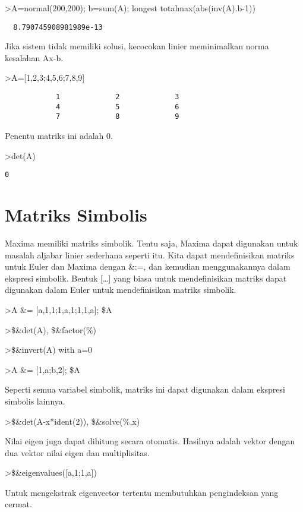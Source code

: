 \documentclass[
]{book}
\begin{document}
\textgreater A=normal(200,200); b=sum(A); longest totalmax(abs(inv(A).b-1))

\begin{verbatim}
  8.790745908981989e-13 
\end{verbatim}

Jika sistem tidak memiliki solusi, kecocokan linier meminimalkan norma kesalahan Ax-b.

\textgreater A={[}1,2,3;4,5,6;7,8,9{]}

\begin{verbatim}
            1             2             3 
            4             5             6 
            7             8             9 
\end{verbatim}

Penentu matriks ini adalah 0.

\textgreater det(A)

\begin{verbatim}
0
\end{verbatim}

\chapter{Matriks Simbolis}\label{matriks-simbolis}

Maxima memiliki matriks simbolik. Tentu saja, Maxima dapat digunakan untuk masalah aljabar linier sederhana seperti itu. Kita dapat mendefinisikan matriks untuk Euler dan Maxima dengan \&:=, dan kemudian menggunakannya dalam ekspresi simbolik. Bentuk {[}\ldots{]} yang biasa untuk mendefinisikan matriks dapat digunakan dalam Euler untuk mendefinisikan matriks simbolik.

\textgreater A \&= {[}a,1,1;1,a,1;1,1,a{]}; \$A

\textgreater\$\&det(A), \$\&factor(\%)

\textgreater\$\&invert(A) with a=0

\textgreater A \&= {[}1,a;b,2{]}; \$A

Seperti semua variabel simbolik, matriks ini dapat digunakan dalam ekspresi simbolis lainnya.

\textgreater\$\&det(A-x*ident(2)), \$\&solve(\%,x)

Nilai eigen juga dapat dihitung secara otomatis. Hasilnya adalah vektor dengan dua vektor nilai eigen dan multiplisitas.

\textgreater\$\&eigenvalues({[}a,1;1,a{]})

Untuk mengekstrak eigenvector tertentu membutuhkan pengindeksan yang cermat.
\end{document}
